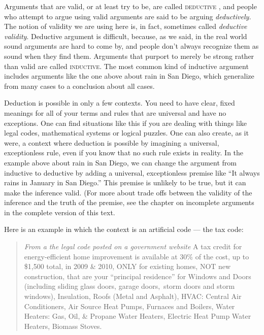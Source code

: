 Arguments that are valid, or at least try to be, are called \textsc{\gls{deductive}} \label{def:deductive}, and people who attempt to argue using valid arguments are said to be arguing \textit{deductively.} The notion of validity we are using here is, in fact, sometimes called \textit{deductive validity}. Deductive argument is difficult, because, as we said, in the real world sound arguments are hard to come by, and people don't always recognize them as sound when they find them. Arguments that purport to merely be strong rather than valid are called \textsc{\gls{inductive}}. \label{def:inductive} The most common kind of inductive argument includes arguments like the one above about rain in San Diego, which generalize from many cases to a conclusion about all cases.

Deduction is possible in only a few contexts. You need to have clear, fixed meanings for all of your terms and rules that are universal and have no exceptions.   One can find situations like this if you are dealing with things like legal codes, mathematical systems or logical puzzles. One can also create, as it were, a context where deduction is possible by imagining a universal, exceptionless rule, even if you know that no such rule exists in reality. In the example above about rain in San Diego, we can change the argument from inductive to deductive by adding a universal, exceptionless premise like ``It always rains in January in San Diego.'' This premise is unlikely to be true, but it can make the inference valid. (For more about trade offs between the validity of the inference and the truth of the premise, see the chapter on incomplete arguments in the complete version of this text.

Here is an example in which the context is an artificial code --- the tax code:

\begin{quote} \noindent\textit{From a the legal code posted on a government website} A tax credit for energy-efficient home improvement is available at 30\% of the cost, up to \$1,500 total, in 2009 \& 2010, ONLY for existing homes, NOT new construction, that are your ``principal residence'' for Windows and Doors (including sliding glass doors, garage doors,~storm doors and storm windows), Insulation, Roofs (Metal and Asphalt), HVAC: Central Air Conditioners, Air Source Heat Pumps, Furnaces and Boilers, Water Heaters: Gas, Oil, \& Propane Water Heaters, Electric Heat Pump Water Heaters, Biomass Stoves. \end{quote}

